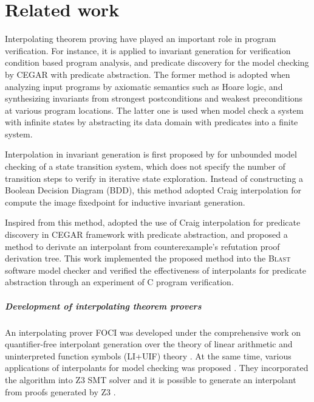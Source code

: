 \chapter{Related work}
\label{chap:related}

Interpolating theorem proving have played an important role in program
verification.  For instance, it is applied to invariant generation for
verification condition based program analysis, and predicate discovery
for the model checking by CEGAR with predicate abstraction.  The
former method is adopted when analyzing input programs by axiomatic
semantics such as Hoare logic, and synthesizing invariants from
strongest postconditions and weakest preconditions at various program
locations.  The latter one is used when model check a system with
infinite states by abstracting its data domain with predicates into a
finite system.

Interpolation in invariant generation is first proposed
by \cite{conf/cav/McMillan03} for unbounded model checking of a state
transition system, which does not specify the number of transition
steps to verify in iterative state exploration.  Instead of
constructing a Boolean Decision Diagram (BDD), this method adopted
Craig interpolation for compute the image fixedpoint for inductive
invariant generation.

Inspired from this method, \cite{conf/popl/HenzingerJMM04} adopted the
use of Craig interpolation for predicate discovery in CEGAR framework
with predicate abstraction, and proposed a method to derivate an
interpolant from counterexample's refutation proof derivation tree.
This work implemented the proposed method into the \textsc{Blast}
software model checker
\cite{conf/popl/HenzingerJMS02,journals/sttt/BeyerHJM07} and verified
the effectiveness of interpolants for predicate abstraction through an
experiment of C program verification.

\paragraph{Development of interpolating theorem provers}
An interpolating prover \textsc{FOCI} \cite{website/foci} was
developed under the comprehensive work on quantifier-free interpolant
generation over the theory of linear arithmetic and uninterpreted
function symbols (LI+UIF) theory \cite{journals/tcs/McMillan05}.  At
the same time, various applications of interpolants for model checking
was proposed \cite{conf/tacas/McMillan05}. They incorporated the
algorithm into \textsc{Z3} SMT solver \cite{conf/tacas/MouraB08} and
it is possible to generate an interpolant from proofs generated by
\textsc{Z3} \cite{conf/fmcad/McMillan11}.


